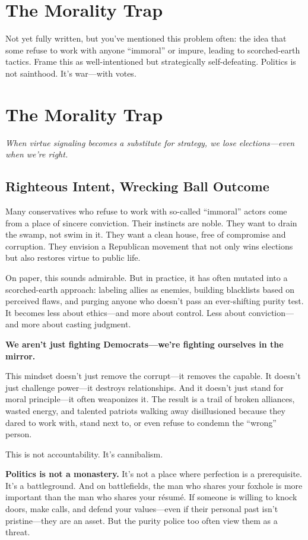 \section{The Morality Trap}
Not yet fully written, but you’ve mentioned this problem often: the idea that some refuse to work with anyone “immoral” or impure, leading to scorched-earth tactics. Frame this as well-intentioned but strategically self-defeating. Politics is not sainthood. It’s war—with votes.


\section*{The Morality Trap}
\textit{When virtue signaling becomes a substitute for strategy, we lose elections—even when we’re right.}

\subsection*{Righteous Intent, Wrecking Ball Outcome}
Many conservatives who refuse to work with so-called ``immoral'' actors come from a place of sincere conviction. Their instincts are noble. They want to drain the swamp, not swim in it. They want a clean house, free of compromise and corruption. They envision a Republican movement that not only wins elections but also restores virtue to public life. 

On paper, this sounds admirable. But in practice, it has often mutated into a scorched-earth approach: labeling allies as enemies, building blacklists based on perceived flaws, and purging anyone who doesn’t pass an ever-shifting purity test. It becomes less about ethics—and more about control. Less about conviction—and more about casting judgment.

\textbf{We aren’t just fighting Democrats—we’re fighting ourselves in the mirror.}

This mindset doesn’t just remove the corrupt—it removes the capable. It doesn’t just challenge power—it destroys relationships. And it doesn’t just stand for moral principle—it often weaponizes it. The result is a trail of broken alliances, wasted energy, and talented patriots walking away disillusioned because they dared to work with, stand next to, or even refuse to condemn the “wrong” person.

This is not accountability. It’s cannibalism.

\textbf{Politics is not a monastery.} It’s not a place where perfection is a prerequisite. It’s a battleground. And on battlefields, the man who shares your foxhole is more important than the man who shares your résumé. If someone is willing to knock doors, make calls, and defend your values—even if their personal past isn’t pristine—they are an asset. But the purity police too often view them as a threat.

